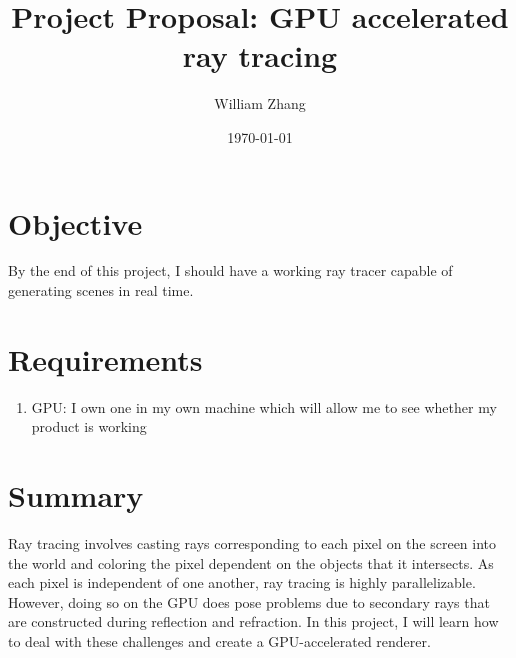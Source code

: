 \documentclass[11pt]{article}
\title{Project Proposal: GPU accelerated ray tracing}
\author{William Zhang}
\date{\today}
\begin{document}
\maketitle
\section{Objective}
By the end of this project, I should have a working ray tracer capable of generating scenes in real time.

\section{Requirements}
\begin{enumerate}
    \item GPU: I own one in my own machine which will allow me to see whether my product is working
\end{enumerate}

\section{Summary}
Ray tracing involves casting rays corresponding to each pixel on the screen into the
world and coloring the pixel dependent on the objects that it intersects. As each pixel
is independent of one another, ray tracing is highly parallelizable. However, doing so
on the GPU does pose problems due to secondary rays that are constructed during reflection
and refraction. In this project, I will learn how to deal with these challenges and create
a GPU-accelerated renderer.
\end{document}
